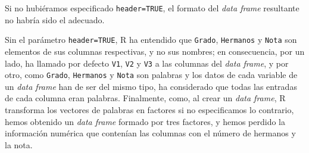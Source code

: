 \documentclass[
]{book}
\newenvironment{Shaded}{\begin{snugshade}}{\end{snugshade}}
\newcommand{\CommentTok}[1]{\textcolor[rgb]{0.56,0.35,0.01}{\textit{#1}}}
\newcommand{\KeywordTok}[1]{\textcolor[rgb]{0.13,0.29,0.53}{\textbf{#1}}}
\newcommand{\NormalTok}[1]{#1}
\newcommand{\StringTok}[1]{\textcolor[rgb]{0.31,0.60,0.02}{#1}}
\theoremstyle{definition}
\theoremstyle{definition}
\theoremstyle{definition}
\theoremstyle{remark}
\begin{document}
\begin{Shaded}
\end{Shaded}

Si no hubiéramos especificado \texttt{header=TRUE}, el formato del \emph{data frame} resultante no habría sido el adecuado.

\begin{Shaded}
\end{Shaded}

Sin el parámetro \texttt{header=TRUE}, R ha entendido que \texttt{Grado}, \texttt{Hermanos} y \texttt{Nota} son elementos de sus columnas respectivas, y no sus nombres; en consecuencia, por un lado, ha llamado por defecto \texttt{V1}, \texttt{V2} y \texttt{V3} a las columnas del \emph{data frame}, y por otro, como \texttt{Grado}, \texttt{Hermanos} y \texttt{Nota} son palabras y los datos de cada variable de un \emph{data frame} han de ser del mismo tipo, ha considerado que todas las entradas de cada columna eran palabras. Finalmente, como, al crear un \emph{data frame}, R transforma los vectores de palabras en factores si no especificamos lo contrario, hemos obtenido un \emph{data frame} formado por tres factores, y hemos perdido la información numérica que contenían las columnas con el número de hermanos y la nota.
\end{document}
